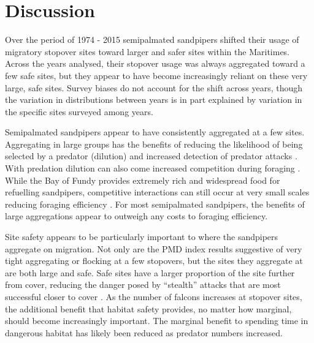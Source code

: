 \section{Discussion}

Over the period of 1974 - 2015 semipalmated sandpipers shifted their usage of migratory stopover sites toward larger and safer sites within the Maritimes. Across the years analysed, their stopover usage was always aggregated toward a few safe sites, but they appear to have become increasingly reliant on these very large, safe sites. Survey biases do not account for the shift across years, though the variation in distributions between years is in part explained by variation in the specific sites surveyed among years.

Semipalmated sandpipers appear to have consistently aggregated at a few sites. Aggregating in large groups has the benefits of reducing the likelihood of being selected by a predator (dilution) and increased detection of predator attacks \citep[many eyes][]{Roberts1996,Bednekoff1998,Fernandez-Juricic2007,Pays2013}. With predation dilution can also come increased competition during foraging \citep{Stillman1997,Vahl2005,Minderman2006c}. While the Bay of Fundy provides extremely rich and widespread food for refuelling sandpipers, competitive interactions can still occur at very small scales reducing foraging efficiency \citep{Vahl2005a,Beauchamp2009a,Beauchamp2014}. For most semipalmated sandpipers, the benefits of large aggregations appear to outweigh any costs to foraging efficiency.

Site safety appears to be particularly important to where the sandpipers aggregate on migration. Not only are the PMD index results suggestive of very tight aggregating or flocking at a few stopovers, but the sites they aggregate at are both large and safe. Safe sites have a larger proportion of the site further from cover, reducing the danger posed by ``stealth'' attacks that are most successful closer to cover \citep{dekker_raptor_2004}. As the number of falcons increases at stopover sites, the additional benefit that habitat safety provides, no matter how marginal, should become increasingly important. The marginal benefit to spending time in dangerous habitat has likely been reduced as predator numbers increased.

